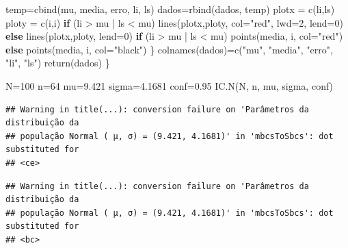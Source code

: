 \documentclass[
]{book}
\newenvironment{Shaded}{\begin{snugshade}}{\end{snugshade}}
\newcommand{\AttributeTok}[1]{\textcolor[rgb]{0.77,0.63,0.00}{#1}}
\newcommand{\ControlFlowTok}[1]{\textcolor[rgb]{0.13,0.29,0.53}{\textbf{#1}}}
\newcommand{\DecValTok}[1]{\textcolor[rgb]{0.00,0.00,0.81}{#1}}
\newcommand{\FloatTok}[1]{\textcolor[rgb]{0.00,0.00,0.81}{#1}}
\newcommand{\FunctionTok}[1]{\textcolor[rgb]{0.00,0.00,0.00}{#1}}
\newcommand{\NormalTok}[1]{#1}
\newcommand{\OtherTok}[1]{\textcolor[rgb]{0.56,0.35,0.01}{#1}}
\newcommand{\SpecialCharTok}[1]{\textcolor[rgb]{0.00,0.00,0.00}{#1}}
\newcommand{\StringTok}[1]{\textcolor[rgb]{0.31,0.60,0.02}{#1}}
\begin{document}
\begin{Shaded}
\begin{Highlighting}[]
\NormalTok{  temp}\OtherTok{=}\FunctionTok{cbind}\NormalTok{(mu, media, erro, li, ls)}
\NormalTok{  dados}\OtherTok{=}\FunctionTok{rbind}\NormalTok{(dados, temp)}
\NormalTok{  plotx }\OtherTok{=} \FunctionTok{c}\NormalTok{(li,ls)}
\NormalTok{  ploty }\OtherTok{=} \FunctionTok{c}\NormalTok{(i,i)}
  \ControlFlowTok{if}\NormalTok{ (li }\SpecialCharTok{\textgreater{}}\NormalTok{ mu }\SpecialCharTok{|}\NormalTok{ ls }\SpecialCharTok{\textless{}}\NormalTok{ mu) }\FunctionTok{lines}\NormalTok{(plotx,ploty, }\AttributeTok{col=}\StringTok{"red"}\NormalTok{, }\AttributeTok{lwd=}\DecValTok{2}\NormalTok{, }\AttributeTok{lend=}\DecValTok{0}\NormalTok{)}
  \ControlFlowTok{else} \FunctionTok{lines}\NormalTok{(plotx,ploty, }\AttributeTok{lend=}\DecValTok{0}\NormalTok{) }
   \ControlFlowTok{if}\NormalTok{ (li }\SpecialCharTok{\textgreater{}}\NormalTok{ mu }\SpecialCharTok{|}\NormalTok{ ls }\SpecialCharTok{\textless{}}\NormalTok{ mu) }\FunctionTok{points}\NormalTok{(media, i, }\AttributeTok{col=}\StringTok{"red"}\NormalTok{)}
  \ControlFlowTok{else} \FunctionTok{points}\NormalTok{(media, i, }\AttributeTok{col=}\StringTok{"black"}\NormalTok{) }
\NormalTok{\} }
\FunctionTok{colnames}\NormalTok{(dados)}\OtherTok{=}\FunctionTok{c}\NormalTok{(}\StringTok{"mu"}\NormalTok{, }\StringTok{"media"}\NormalTok{, }\StringTok{"erro"}\NormalTok{, }\StringTok{"li"}\NormalTok{, }\StringTok{"ls"}\NormalTok{)}
\FunctionTok{return}\NormalTok{(dados)}
\NormalTok{\}}
\end{Highlighting}
\end{Shaded}

\hfill\break

\begin{Shaded}
\begin{Highlighting}[]
\NormalTok{N}\OtherTok{=}\DecValTok{100}
\NormalTok{n}\OtherTok{=}\DecValTok{64}
\NormalTok{mu}\OtherTok{=}\FloatTok{9.421}
\NormalTok{sigma}\OtherTok{=}\FloatTok{4.1681}
\NormalTok{conf}\OtherTok{=}\FloatTok{0.95}
\FunctionTok{IC.N}\NormalTok{(N, n, mu, sigma, conf)}
\end{Highlighting}
\end{Shaded}

\begin{verbatim}
## Warning in title(...): conversion failure on 'Parâmetros da distribuição da
## população Normal ( μ, σ) = (9.421, 4.1681)' in 'mbcsToSbcs': dot substituted for
## <ce>
\end{verbatim}

\begin{verbatim}
## Warning in title(...): conversion failure on 'Parâmetros da distribuição da
## população Normal ( μ, σ) = (9.421, 4.1681)' in 'mbcsToSbcs': dot substituted for
## <bc>
\end{verbatim}
\end{document}

